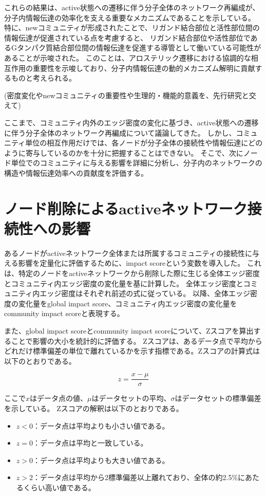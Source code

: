 これらの結果は、active状態への遷移に伴う分子全体のネットワーク再編成が、分子内情報伝達の効率化を支える重要なメカニズムであることを示している。
特に、newコミュニティが形成されたことで、リガンド結合部位と活性部位間の情報伝達が促進されている点を考慮すると、
リガンド結合部位や活性部位であるGタンパク質結合部位間の情報伝達を促進する導管として働いている可能性があることが示唆された。
このことは、アロステリック遷移における協調的な相互作用の重要性を示唆しており、分子内情報伝達の動的メカニズム解明に貢献するものと考えられる。

(密度変化やnewコミュニティの重要性や生理的・機能的意義を、先行研究と交えて)

ここまで、コミュニティ内外のエッジ密度の変化に基づき、active状態への遷移に伴う分子全体のネットワーク再編成について議論してきた。
しかし、コミュニティ単位の相互作用だけでは、各ノードが分子全体の接続性や情報伝達にどのように寄与しているのかを十分に把握することはできない。
そこで、次にノード単位でのコミュニティに与える影響を詳細に分析し、分子内のネットワークの構造や情報伝達効率への貢献度を評価する。


\section{ノード削除によるactiveネットワーク接続性への影響}

あるノードがactiveネットワーク全体または所属するコミュニティの接続性に与える影響を定量化に評価するために、impact scoreという変数を導入した。
これは、特定のノードをactiveネットワークから削除した際に生じる全体エッジ密度とコミュニティ内エッジ密度の変化量を基に計算した。
全体エッジ密度とコミュニティ内エッジ密度はそれぞれ前述の式に従っている。
以降、全体エッジ密度の変化量をglobal impact score、コミュニティ内エッジ密度の変化量をcommunity impact scoreと表現する。

また、global impact scoreとcommunity impact scoreについて、Zスコアを算出することで影響の大小を統計的に評価する。
Zスコアは、あるデータ点で平均からどれだけ標準偏差の単位で離れているかを示す指標である。Zスコアの計算式は以下のとおりである。

\begin{equation}
z = \frac{x - \mu}{\sigma}
\end{equation}

ここで$x$はデータ点の値、$\mu$はデータセットの平均、$\sigma$はデータセットの標準偏差を示している。
Zスコアの解釈は以下のとおりである。
\begin{itemize}
    \item \( z < 0 \)：データ点は平均よりも小さい値である。
    \item \( z = 0 \)：データ点は平均と一致している。
    \item \( z > 0 \)：データ点は平均よりも大きい値である。
    \item \( z > 2 \)：データ点は平均から2標準偏差以上離れており、全体の約2.5\%にあたるくらい高い値である。
\end{itemize}

